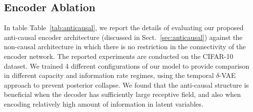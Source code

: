 \documentclass{article} \usepackage{iclr2019_conference,times}
\newcommand{\tblref}[1]{Table~\ref{#1}}
\newcommand{\sref}[1]{Sect.~\ref{#1}}
\begin{document}
\subsection{Encoder Ablation}\label{app:encabl}
In table \tblref{tab:anticausal}, we report the details of evaluating our proposed anti-causal encoder architecture (discussed in \sref{sec:anticausal}) against the non-causal architecture in which there is no restriction in the connectivity of the encoder network. The reported experiments are conducted on the CIFAR-10 dataset. We trained 4 different configurations of our model to provide comparison in different capacity and information rate regimes, using the temporal $\delta$-VAE approach to prevent posterior collapse.  We found that the anti-causal structure is beneficial when the decoder has sufficiently large receptive field, and also when encoding relatively high amount of information in latent variables.
\end{document}
